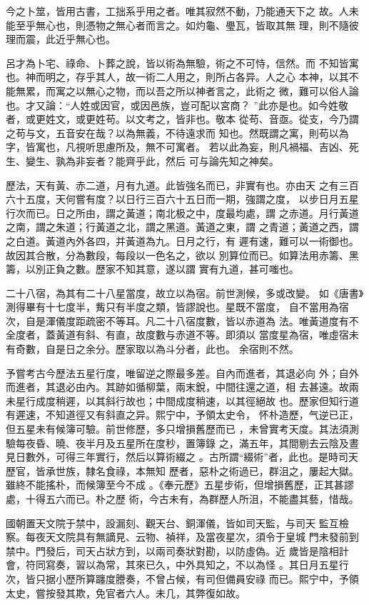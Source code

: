 \documentclass{ctexart}
\begin{document}
今之卜筮，皆用古書，工拙系乎用之者。唯其寂然不動，乃能通天下之 故。人未能至乎無心也，則憑物之無心者而言之。如灼龜、璺瓦，皆取其無 理，則不隨彼理而震，此近乎無心也。

呂才為卜宅、祿命、卜葬之說，皆以術為無驗，術之不可恃，信然。而 不知皆寓也。神而明之，存乎其人，故一術二人用之，則所占各异。人之心 本神，以其不能無累，而寓之以無心之物，而以吾之所以神者言之，此術之 微，難可以俗人論也。才又論：``人姓或因官，或因邑族，豈可配以宮商？ ''此亦是也。如今姓敬者，或更姓文，或更姓苟。以文考之，皆非也。敬本 從苟、音亟。從支，今乃謂之苟与文，五音安在哉？以為無義，不待遠求而 知也。然既謂之寓，則苟以為字，皆寓也，凡視听思慮所及，無不可寓者。 若以此為妄，則凡禍福、吉凶、死生、變生、孰為非妄者？能齊乎此，然后 可与論先知之神矣。

歷法，天有黃、赤二道，月有九道。此皆強名而已，非實有也。亦由天 之有三百六十五度，天何嘗有度？以日行三百六十五日而一期，強謂之度， 以步日月五星行次而已。日之所由，謂之黃道；南北极之中，度最均處，謂 之赤道。月行黃道之南，謂之朱道；行黃道之北，謂之黑道。黃道之東，謂 之青道；黃道之西，謂之白道。黃道內外各四，并黃道為九。日月之行，有 遲有速，難可以一術御也。故因其合散，分為數段，每段以一色名之，欲以 別算位而已。如算法用赤籌、黑籌，以別正負之數。歷家不知其意，遂以謂 實有九道，甚可嗤也。

二十八宿，為其有二十八星當度，故立以為宿。前世測候，多或改變。 如《唐書》測得畢有十七度半，觜只有半度之類，皆謬說也。星既不當度， 自不當用為宿次，自是渾儀度距疏密不等耳。凡二十八宿度數，皆以赤道為 法。唯黃道度有不全度者，蓋黃道有斜、有直，故度數与赤道不等。即須以 當度星為宿，唯虛宿未有奇數，自是日之余分。歷家取以為斗分者，此也。 余宿則不然。

予嘗考古今歷法五星行度，唯留逆之際最多差。自內而進者，其退必向 外；自外而進者，其退必由內。其跡如循柳葉，兩末銳，中間往還之道，相 去甚遠。故兩未星行成度稍遲，以其斜行故也；中間成度稍速，以其徑絕故 也。歷家但知行道有遲速，不知道徑又有斜直之异。熙宁中，予領太史令， 怀朴造歷，气逆已正，但五星未有候簿可驗。前世修歷，多只增損舊歷而已 ，未曾實考天度。其法須測驗每夜昏、曉、夜半月及五星所在度秒，置簿錄 之，滿五年，其間剔去云陰及晝見日數外，可得三年實行，然后以算術綴之 。古所謂``綴術''者，此也。是時司天歷官，皆承世族，隸名食祿，本無知 歷者，惡朴之術過已，群沮之，屢起大獄。雖終不能搖朴，而候簿至今不成 。《奉元歷》五星步術，但增損舊歷，正其甚謬處，十得五六而已。朴之歷 術，今古未有，為群歷人所沮，不能盡其藝，惜哉。

國朝置天文院于禁中，設漏刻、觀天台、銅渾儀，皆如司天監，与司天 監互檢察。每夜天文院具有無謫見、云物、禎祥，及當夜星次，須令于皇城 門未發前到禁中。門發后，司天占狀方到，以兩司奏狀對勘，以防虛偽。近 歲皆是陰相計會，符同寫奏，習以為常，其來已久，中外具知之，不以為怪 。其日月五星行次，皆只据小歷所算躔度謄奏，不曾占候，有司但備員安祿 而已。熙宁中，予領太史，嘗按發其欺，免官者六人。未几，其弊復如故。
\end{document}
